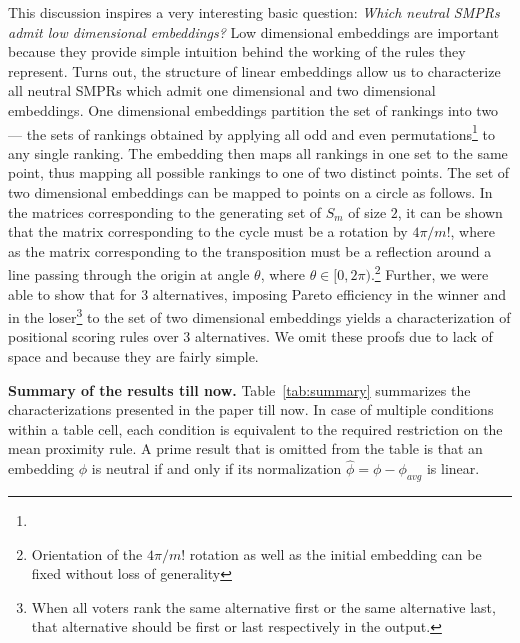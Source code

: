 \documentclass[prodmode,acmec]{ec-acmsmall}
\begin{document}
This discussion inspires a very interesting basic question: \emph{Which neutral SMPRs admit low dimensional embeddings?} Low dimensional embeddings are important because they provide simple intuition behind the working of the rules they represent. Turns out, the structure of linear embeddings allow us to characterize all neutral SMPRs which admit one dimensional and two dimensional embeddings. One dimensional embeddings partition the set of rankings into two --- the sets of rankings obtained by applying all odd and even permutations\footnote{} to any single ranking. The embedding then maps all rankings in one set to the same point, thus mapping all possible rankings to one of two distinct points. The set of two dimensional embeddings can be mapped to points on a circle as follows. In the matrices corresponding to the generating set of $S_m$ of size $2$, it can be shown that the matrix corresponding to the cycle must be a rotation by $4 \pi / m!$, where as the matrix corresponding to the transposition must be a reflection around a line passing through the origin at angle $\theta$, where $\theta \in [0,2\pi)$.\footnote{Orientation of the $4\pi/m!$ rotation as well as the initial embedding can be fixed without loss of generality} Further, we were able to show that for $3$ alternatives, imposing Pareto efficiency in the winner and in the loser\footnote{When all voters rank the same alternative first or the same alternative last, that alternative should be first or last respectively in the output.} to the set of two dimensional embeddings yields a characterization of positional scoring rules over $3$ alternatives. We omit these proofs due to lack of space and because they are fairly simple.


\medskip
\noindent \textbf{Summary of the results till now.} Table~\ref{tab:summary} summarizes the characterizations presented in the paper till now. In case of multiple conditions within a table cell, each condition is equivalent to the required restriction on the mean proximity rule. A prime result that is omitted from the table is that an embedding $\phi$ is neutral if and only if its normalization $\hat{\phi} = \phi-\phi_{avg}$ is linear. 
\end{document}
